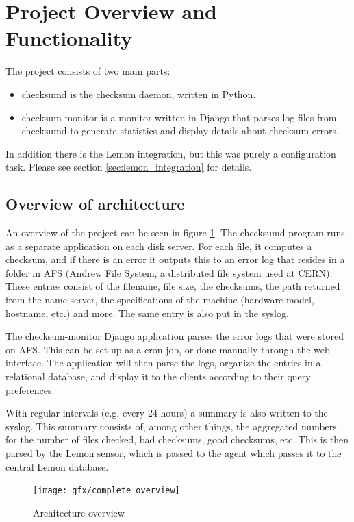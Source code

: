 \section{Project Overview and Functionality}

The project consists of two main parts:
\begin{itemize}
\item checksumd is the checksum daemon, written in Python. 
\item checksum-monitor is a monitor written in Django that parses log files from checksumd to generate statistics and display details about checksum errors.
\end{itemize}

In addition there is the Lemon integration, but this was purely a configuration task. Please see section \ref{sec:lemon_integration} for details. 

\subsection{Overview of architecture}
An overview of the project can be seen in figure \ref{fig:complete_overview}. The checksumd program runs as a separate application on each disk server. For each file, it computes a checksum, and if there is an error it outputs this to an error log that resides in a folder in AFS (Andrew File System, a distributed file system used at CERN\cite{afs}). These entries consist of the filename, file size, the checksums, the path returned from the name server, the specifications of the machine (hardware model, hostname, etc.) and more. The same entry is also put in the syslog. 

The checksum-monitor Django application parses the error logs that were stored on AFS. This can be set up as a cron job, or done manually through the web interface. The application will then parse the logs, organize the entries in a relational database, and display it to the clients according to their query preferences.

With regular intervals (e.g. every 24 hours) a summary is also written to the syslog. This summary consists of, among other things, the aggregated numbers for the number of files checked, bad checksums, good checksums, etc. This is then parsed by the Lemon sensor, which is passed to the agent which passes it to the central Lemon database.

\begin{figure}[ht]
\centering
\texttt{[image: gfx/complete\_overview]}
\caption{Architecture overview}
\label{fig:complete_overview}
\end{figure}


